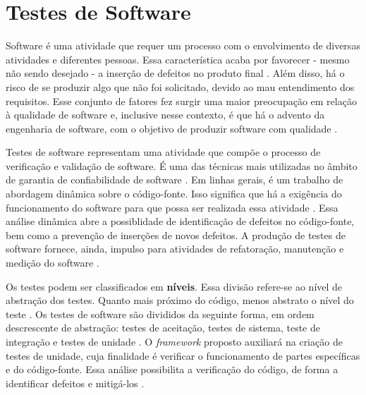 \section{Testes de Software}
Software é uma atividade que requer um processo com o envolvimento de diversas
atividades e diferentes pessoas. Essa característica acaba por favorecer - mesmo
não sendo desejado - a inserção de defeitos no produto final \cite{trodo2009}.
Além disso, há o risco de se produzir algo que não foi solicitado, devido ao
mau entendimento dos requisitos\cite{barbosaEtAl2009}. Esse conjunto de
fatores fez surgir uma maior preocupação em relação à qualidade de software e,
inclusive nesse contexto, é que há o advento da engenharia de software, com o
objetivo de produzir software com qualidade \cite{buenoCampelo2013}.

Testes de software representam uma atividade que compõe o processo de
verificação e validação de software. É uma das técnicas mais utilizadas no
âmbito de garantia de confiabilidade de software \cite{barbosaEtAl2009}. Em linhas gerais, é um
trabalho de abordagem dinâmica sobre o código-fonte. Isso significa que há a
exigência do funcionamento do software para que possa ser realizada essa
atividade \cite{barbosaEtAl2009}. Essa análise dinâmica abre a possiblidade de
identificação de defeitos no código-fonte, bem como a prevenção de inserções de
novos defeitos. A produção de testes de software fornece, ainda, impulso para
atividades de refatoração, manutenção e medição do software
\cite{barbosaEtAl2009}.
\par
\indent Os testes podem ser classificados em \textbf{níveis}. Essa divisão
refere-se ao nível de abstração dos testes. Quanto mais próximo do código,
menos abstrato o nível do teste \cite{sommerville2007}. Os testes de software
são divididos da seguinte forma, em ordem descrescente de abstração: testes de aceitação, testes de sistema, teste de integração e testes de unidade \cite{sommerville2007}. O \textit{framework} proposto auxiliará na criação de testes de unidade, cuja finalidade é verificar o funcionamento de partes específicas e do código-fonte. Essa análise possibilita a verificação do código, de forma a identificar defeitos e mitigá-los \cite{sommerville2007}.

